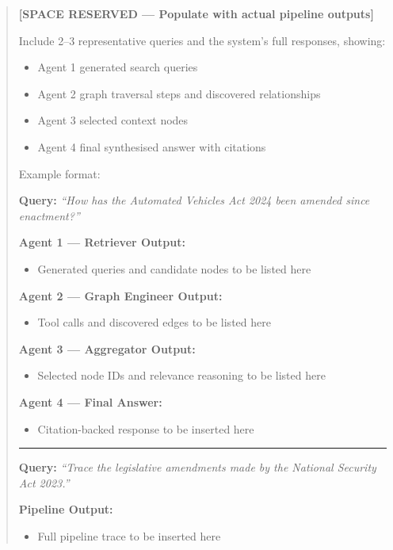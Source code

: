 \documentclass[10pt, a4paper, twocolumn]{article}
\begin{document}
\begin{quote}
\textbf{[SPACE RESERVED — Populate with actual pipeline outputs]}

Include 2–3 representative queries and the system's full responses, showing:
\begin{itemize}
    \item Agent 1 generated search queries
    \item Agent 2 graph traversal steps and discovered relationships
    \item Agent 3 selected context nodes
    \item Agent 4 final synthesised answer with citations
\end{itemize}

Example format:

\textbf{Query:} \textit{``How has the Automated Vehicles Act 2024 been amended since enactment?''}

\textbf{Agent 1 — Retriever Output:}
\begin{itemize}
    \item Generated queries and candidate nodes to be listed here
\end{itemize}

\textbf{Agent 2 — Graph Engineer Output:}
\begin{itemize}
    \item Tool calls and discovered edges to be listed here
\end{itemize}

\textbf{Agent 3 — Aggregator Output:}
\begin{itemize}
    \item Selected node IDs and relevance reasoning to be listed here
\end{itemize}

\textbf{Agent 4 — Final Answer:}
\begin{itemize}
    \item Citation-backed response to be inserted here
\end{itemize}

\hrule
\vspace{0.2cm}

\textbf{Query:} \textit{``Trace the legislative amendments made by the National Security Act 2023.''}

\textbf{Pipeline Output:}
\begin{itemize}
    \item Full pipeline trace to be inserted here
\end{itemize}
\end{quote}
\end{document}

